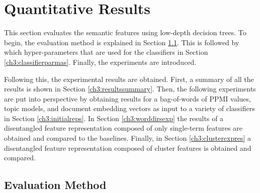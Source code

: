 

\section{Quantitative Results}\label{ch3:quantitative}

This section evaluates the semantic features  using  low-depth decision trees. To begin, the evaluation method is explained in Section \ref{ch3:evaluationmethodq}. This is followed by which hyper-parameters that are used for the classifiers in Section \ref{ch3:classifierparmas}. Finally, the experiments are introduced.

Following this, the experimental results are obtained. First, a summary of all the results is shown  in Section \ref{ch3:resultssummary}. Then, the following experiments are put into perspective by obtaining results  for a bag-of-words of PPMI values, topic models, and document embedding vectors as input to a variety of classifiers in Section \ref{ch3:initialreps}. In Section \ref{ch3:worddirsexp} the results of a disentangled feature representation composed of only single-term features are obtained and compared to the baselines. Finally, in Section  \ref{ch3:clusterexpres} a disentangled feature representation composed of cluster features is obtained and compared. 

\subsection{Evaluation Method}\label{ch3:evaluationmethodq}

